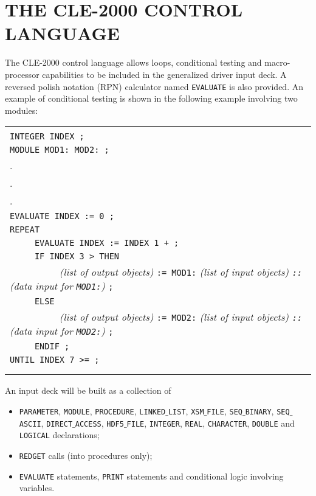 \section{THE CLE-2000 CONTROL LANGUAGE}

The CLE-2000 control language allows  loops, conditional testing and
macro-processor capabilities to be included in the generalized driver input
deck. A reversed polish notation (RPN) calculator named {\tt EVALUATE} is also
provided. An example of conditional testing is shown in the following example
involving two modules:

\vskip 0.4cm

\noindent\begin{tabular}{|l|}
\hline \\
{\tt INTEGER INDEX ;} \\
{\tt MODULE MOD1: MOD2: ;} \\
. \\
. \\
. \\
{\tt EVALUATE INDEX := 0 ;} \\
{\tt REPEAT} \\
{\tt ~~~~~EVALUATE INDEX := INDEX 1 + ;} \\
{\tt ~~~~~IF INDEX 3 > THEN} \\
{\tt ~~~~~~~~~~}{\sl (list of output objects)} {\tt := MOD1:} {\sl (list of input objects) {\tt ::} (data input for {\tt MOD1:})} {\tt ; }\\
{\tt ~~~~~ELSE} \\
{\tt ~~~~~~~~~~}{\sl (list of output objects)} {\tt := MOD2:} {\sl (list of input objects) {\tt ::} (data input for {\tt MOD2:})} {\tt ;} \\
{\tt ~~~~~ENDIF ;} \\
{\tt UNTIL INDEX 7 >= ;} \\
\\ \\ \hline
\end{tabular}

\vskip 0.4cm

An input deck will be built as a collection of 
\begin{itemize}
\item {\tt PARAMETER}, {\tt MODULE}, {\tt PROCEDURE}, {\tt LINKED}$\_${\tt LIST}, {\tt XSM}$\_${\tt FILE}, {\tt SEQ}$\_${\tt BINARY}, {\tt SEQ}$\_${\tt ASCII},
{\tt DIRECT}$\_${\tt ACCESS}, {\tt HDF5}$\_${\tt FILE}, {\tt INTEGER}, {\tt REAL}, {\tt CHARACTER}, {\tt DOUBLE} and {\tt LOGICAL} declarations;
\item {\tt REDGET} calls (into procedures only);
\item {\tt EVALUATE} statements, {\tt PRINT} statements and conditional logic involving variables.
\end{itemize}

